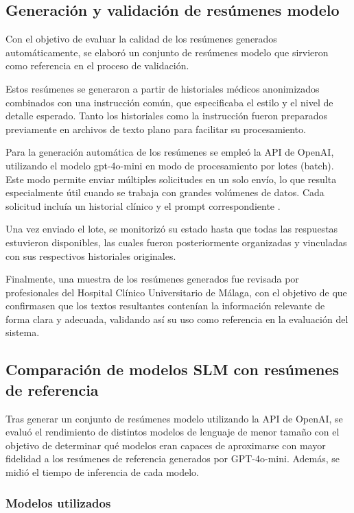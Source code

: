 \documentclass[../main.tex]{subfiles}
\begin{document}
	
	\subsection{Generación y validación de resúmenes modelo}
	
	Con el objetivo de evaluar la calidad de los resúmenes generados automáticamente, se elaboró un conjunto de resúmenes modelo que sirvieron como referencia en el proceso de validación.
	
	Estos resúmenes se generaron a partir de historiales médicos anonimizados combinados con una instrucción común, que especificaba el estilo y el nivel de detalle esperado. Tanto los historiales como la instrucción fueron preparados previamente en archivos de texto plano para facilitar su procesamiento.
	
	Para la generación automática de los resúmenes se empleó la API de OpenAI, utilizando el modelo gpt-4o-mini en modo de procesamiento por lotes (batch). Este modo permite enviar múltiples solicitudes en un solo envío, lo que resulta especialmente útil cuando se trabaja con grandes volúmenes de datos. Cada solicitud incluía un historial clínico y el prompt correspondiente \parencite{openaiBatch}.
	
	Una vez enviado el lote, se monitorizó su estado hasta que todas las respuestas estuvieron disponibles, las cuales fueron posteriormente organizadas y vinculadas con sus respectivos historiales originales.
	
	Finalmente, una muestra de los resúmenes generados fue revisada por profesionales del Hospital Clínico Universitario de Málaga, con el objetivo de que confirmasen que los textos resultantes contenían la información relevante de forma clara y adecuada, validando así su uso como referencia en la evaluación del sistema.
	
	
	\subsection{Comparación de modelos SLM con resúmenes de referencia}
	
	Tras generar un conjunto de resúmenes modelo utilizando la API de OpenAI, se evaluó el rendimiento de distintos modelos de lenguaje de menor tamaño con el objetivo de determinar qué modelos eran capaces de aproximarse con mayor fidelidad a los resúmenes de referencia generados por GPT-4o-mini. Además, se midió el tiempo de inferencia de cada modelo.
	
	\subsubsection{Modelos utilizados}
	
\end{document}
